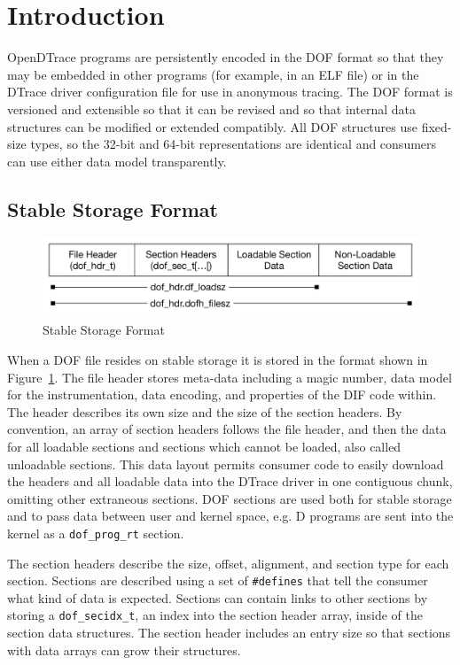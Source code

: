 \section{Introduction}
\label{sec:dof-intro}

OpenDTrace programs are persistently encoded in the DOF format so that
they may be embedded in other programs (for example, in an ELF file)
or in the DTrace driver configuration file for use in anonymous
tracing.  The DOF format is versioned and extensible so that it can be
revised and so that internal data structures can be modified or
extended compatibly.  All DOF structures use fixed-size types, so the
32-bit and 64-bit representations are identical and consumers can use
either data model transparently.

\subsection{Stable Storage Format}
\label{sec:dof-stable-storage}

\begin{figure}[h]
  \centering
  \includegraphics[width=.8\textwidth]{dof-stable-format}
  \caption{Stable Storage Format}
  \label{fig:dof-stable-storage-format}
\end{figure}

When a DOF file resides on stable storage it is stored in the format
shown in Figure~\ref{fig:dof-stable-storage-format}. The file header
stores meta-data including a magic number, data model for the
instrumentation, data encoding, and properties of the DIF code within.
The header describes its own size and the size of the section headers.
By convention, an array of section headers follows the file header,
and then the data for all loadable sections and sections which cannot
be loaded, also called unloadable sections.  This data layout permits
consumer code to easily download the headers and all loadable data
into the DTrace driver in one contiguous chunk, omitting other
extraneous sections.  DOF sections are used both for stable storage
and to pass data between user and kernel space, e.g. D programs are
sent into the kernel as a \verb|dof_prog_rt| section.

The section headers describe the size, offset, alignment, and section
type for each section.  Sections are described using a set of \verb|#defines|
that tell the consumer what kind of data is expected.  Sections can
contain links to other sections by storing a \verb|dof_secidx_t|, an index
into the section header array, inside of the section data structures.
The section header includes an entry size so that sections with data
arrays can grow their structures.

